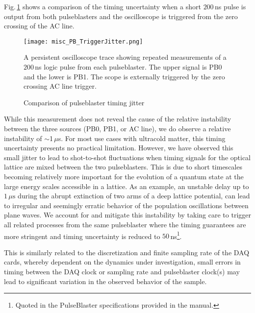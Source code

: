 Fig.\,\ref{fig:pbTimingJitter} shows a comparison of the timing uncertainty when a short $200$\,ns pulse is output from both pulseblasters and the oscilloscope is triggered from the zero crossing of the AC line.
	\begin{figure}
		\centerline{
		\texttt{[image: misc\_PB\_TriggerJitter.png]}}
		\caption{Comparison of pulseblaster timing jitter}{A persistent oscilloscope trace showing repeated measurements of a $200$\,ns logic pulse from each pulseblaster. The upper signal is PB0 and the lower is PB1. The scope is externally triggered by the zero crossing AC line trigger.}
		\label{fig:pbTimingJitter}
	\end{figure} 
While this measurement does not reveal the cause of the relative instability between the three sources (PB0, PB1, or AC line), we do observe a relative instability of $\sim$1\,$\mu$s.
For most use cases with ultracold matter, this timing uncertainty presents no practical limitation.
However, we have observed this small jitter to lead to shot-to-shot fluctuations when timing signals for the optical lattice are mixed between the two pulseblasters.
This is due to short timescales becoming relatively more important for the evolution of a quantum state at the large energy scales accessible in a lattice.
As an example, an unstable delay up to $1\,\mu \text{s}$ during the abrupt extinction of two arms of a deep lattice potential, can lead to irregular and seemingly erratic behavior of the population oscillations between plane waves.
We account for and mitigate this instability by taking care to trigger all related processes from the same pulseblaster where the timing guarantees are more stringent and timing uncertainty is reduced to $50$\,ns\footnote{Quoted in the PulseBlaster specifications provided in the manual.}.

This is similarly related to the discretization and finite sampling rate of the DAQ cards, whereby dependent on the dynamics under investigation, small errors in timing between the DAQ clock or sampling rate and pulseblaster clock(s) may lead to significant variation in the observed behavior of the sample.



